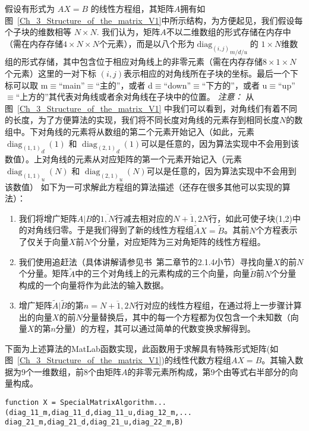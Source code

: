 \documentclass[twoside]{book}
\begin{document}
\begin{CJK*}{GBK}{song}
假设有形式为 $AX = B$ 的线性方程组，其矩阵$A$拥有如图~\ref{Ch_3_Structure_of_the_matrix_V1}中所示结构，为方便起见，我们假设每个子块的维数相等 $N \times N$. 我们认为，矩阵$A$不以二维数组的形式存储在内存中（需在内存存储$4 \times N \times N$个元素），而是以八个形为${\operatorname{diag}_{(i,j)}}_{m/d/u}$的 $1 \times N$维数组的形式存储，其中包含位于相应对角线上的非零元素（需在内存存储$8 \times 1 \times N$个元素）这里的一对下标 $(i,j)$表示相应的对角线所在子块的坐标。最后一个下标可以取 m$\equiv$“main”$\equiv$“主的”，或者 d$\equiv$“down”$\equiv$“下方的”，或者 u$\equiv$“up”$\equiv$“上方的”其代表对角线或者余对角线在子块中的位置。
\emph{注意：} 从图~\ref{Ch_3_Structure_of_the_matrix_V1} 中我们可以看到，对角线们有着不同的长度，为了方便算法的实现，我们将不同长度对角线的元素存到相同长度$N$的数组中。下对角线的元素将从数组的第二个元素开始记入（如此，元素${\operatorname{diag}_{(1,1)}}_{d}(1)$ 和 ${\operatorname{diag}_{(2,1)}}_{d}(1)$可以是任意的，因为算法实现中不会用到该数值）。上对角线的元素从对应矩阵的第一个元素开始记入（元素${\operatorname{diag}_{(1,1)}}_{u}(N)$ 和 ${\operatorname{diag}_{(2,1)}}_{u}(N)$可以是任意的，因为算法实现中不会用到该数值）
如下为一可求解此方程组的算法描述（还存在很多其他可以实现的算法）：

\begin{enumerate}
	\item 我们将增广矩阵$A|B$的$\overline{1, N}$行减去相对应的$\overline{N + 1, 2N}$行，如此可使子块(1,2)中的对角线归零。于是我们得到了新的线性方程组$\tilde{A}X = \tilde{B}$。其前$N$个方程表示了仅关于向量$X$前$N$个分量，对应矩阵为三对角矩阵的线性方程组。
	\item 我们使用追赶法（具体讲解请参见书~\cite{Kalitkin_book_1}第二章节的2.1.4小节）寻找向量$X$的前$N$个分量。矩阵$\tilde{A}$中的三个对角线上的元素构成的三个向量，向量$\tilde{B}$前$N$个分量构成的一个向量将作为此法的输入数据。
	\item 增广矩阵$\tilde{A}|\tilde{B}$的第$n = \overline{N + 1,2N}$行对应的线性方程组，在通过将上一步骤计算出的向量$X$的前$N$分量替换后，其中的每一个方程都为仅包含一个未知数（向量$X$的第$n$分量）的方程，其可以通过简单的代数变换求解得到。
\end{enumerate}


下面为上述算法的MatLab函数实现，此函数用于求解具有特殊形式矩阵(如图~\ref{Ch_3_Structure_of_the_matrix_V1})的线性代数方程组$AX = B$。其输入数据为9个一维数组，前8个由矩阵$A$的非零元素所构成，第9个由等式右半部分的向量构成。
%
\begin{lstlisting}
function X = SpecialMatrixAlgorithm...
(diag_11_m,diag_11_d,diag_11_u,diag_12_m,...
diag_21_m,diag_21_d,diag_21_u,diag_22_m,B)


\end{lstlisting}
\end{CJK*}
\end{document}

